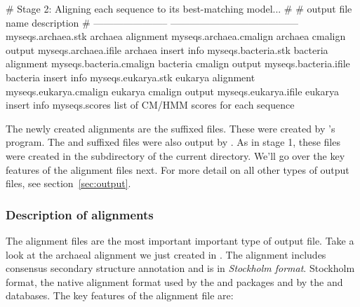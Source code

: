 \begin{sreoutput}
# Stage 2: Aligning each sequence to its best-matching model...
#
# output file name         description
# -----------------------  ---------------------------------------
  myseqs.archaea.stk       archaea alignment
  myseqs.archaea.cmalign   archaea cmalign output
  myseqs.archaea.ifile     archaea insert info
  myseqs.bacteria.stk      bacteria alignment
  myseqs.bacteria.cmalign  bacteria cmalign output
  myseqs.bacteria.ifile    bacteria insert info
  myseqs.eukarya.stk       eukarya alignment
  myseqs.eukarya.cmalign   eukarya cmalign output
  myseqs.eukarya.ifile     eukarya insert info
  myseqs.scores            list of CM/HMM scores for each sequence
\end{sreoutput}

The newly created alignments are the  suffixed files. These
were created by 's  program. The
 and  suffixed files were also output by
. As in stage 1, these files were created in the
 subdirectory of the current directory. We'll go over
the key features of the alignment files next. For more detail on all
other types of output files, see section~\ref{sec:output}.

\subsubsection{Description of alignments}
\label{sec:tutorial-stk}

The alignment files are the most important important type of output
file. Take a look at the archaeal alignment we just created in
. The alignment includes consensus
secondary structure annotation and is in \emph{Stockholm format}.
Stockholm format, the native alignment format used by the 
and  packages and by the  and 
databases. The key features of the alignment file are:

